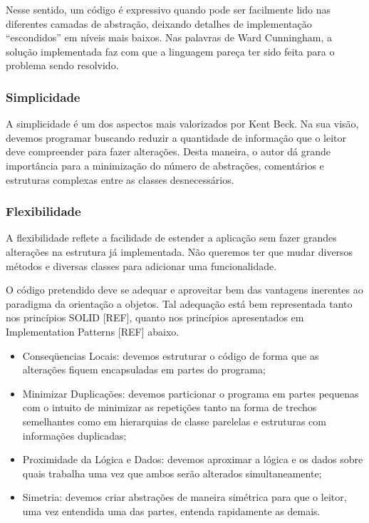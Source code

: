 Nesse sentido, um código é expressivo quando pode ser facilmente lido nas diferentes camadas de abstração, deixando detalhes de implementação ``escondidos'' em níveis mais baixos. Nas palavras de Ward Cunningham, a solução implementada faz com que a linguagem pareça ter sido feita para o problema sendo resolvido.

\subsubsection{Simplicidade}
A simplicidade é um dos aspectos mais valorizados por Kent Beck. Na sua visão, devemos programar buscando reduzir a quantidade de informação que o leitor deve compreender para fazer alterações. Desta maneira, o autor dá grande importância para a minimização do número de abstrações, comentários e estruturas complexas entre as classes desnecessários.

\subsubsection{Flexibilidade}
A flexibilidade reflete a facilidade de estender a aplicação sem fazer grandes alterações na estrutura já implementada. Não queremos ter que mudar diversos métodos e diversas classes para adicionar uma funcionalidade.

O código pretendido deve se adequar e aproveitar bem das vantagens inerentes ao paradigma da orientação a objetos. Tal adequação está bem representada tanto nos princípios SOLID [REF], quanto nos princípios apresentados em Implementation Patterns [REF] abaixo.

\begin{itemize}
	\item Conseqüencias Locais: devemos estruturar o código de forma que as alterações fiquem encapsuladas em partes do programa;
	\item Minimizar Duplicações: devemos particionar o programa em partes pequenas com o intuito de minimizar as repetições tanto na forma de trechos semelhantes como em hierarquias de classe parelelas e estruturas com informações duplicadas;
	\item Proximidade da Lógica e Dados: devemos aproximar a lógica e os dados sobre quais trabalha uma vez que ambos serão alterados simultaneamente;
	\item Simetria: devemos criar abstrações de maneira simétrica para que o leitor, uma vez entendida uma das partes, entenda rapidamente as demais.
\end{itemize}

